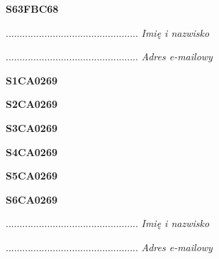 \begin{turn}{90}\huge \textbf{S63FBC68}\end{turn}

\begin{turn}{90}\begin{minipage}{\linewidth} \vspace{20mm} ................................................  \textit{Imię i nazwisko}\end{minipage}\end{turn}

\begin{turn}{90}\begin{minipage}{\linewidth} \vspace{20mm} ................................................  \textit{Adres e-mailowy}\end{minipage}\end{turn}

\begin{turn}{90}\huge \textbf{S1CA0269}\end{turn}

\begin{turn}{90}\huge \textbf{S2CA0269}\end{turn}

\begin{turn}{90}\huge \textbf{S3CA0269}\end{turn}

\begin{turn}{90}\huge \textbf{S4CA0269}\end{turn}

\begin{turn}{90}\huge \textbf{S5CA0269}\end{turn}

\begin{turn}{90}\huge \textbf{S6CA0269}\end{turn}

\begin{turn}{90}\begin{minipage}{\linewidth} \vspace{20mm} ................................................  \textit{Imię i nazwisko}\end{minipage}\end{turn}

\begin{turn}{90}\begin{minipage}{\linewidth} \vspace{20mm} ................................................  \textit{Adres e-mailowy}\end{minipage}\end{turn}

